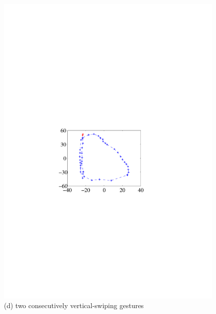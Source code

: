 \begin{figure}[!t]
{\begin{minipage}[t]{0.19\textwidth}
            \includegraphics[width=\textwidth]{fig/gesture-distinction4.pdf}\\
            \centering  (d) two consecutively vertical-swiping gestures
            \end{minipage}
        }
\end{figure}

